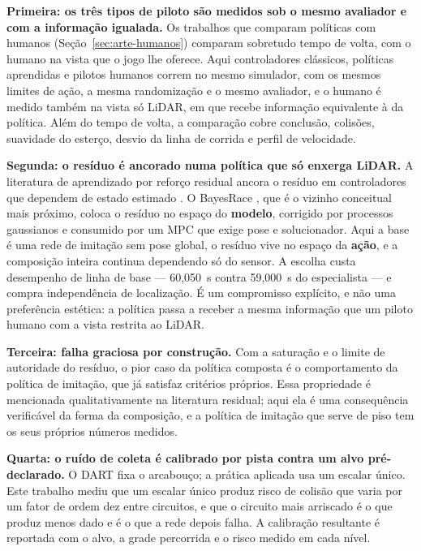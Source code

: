 \textbf{Primeira: os três tipos de piloto são medidos sob o mesmo avaliador e com
a informação igualada.} Os trabalhos que comparam políticas com humanos
(Seção~\ref{sec:arte-humanos}) comparam sobretudo tempo de volta, com o humano na
vista que o jogo lhe oferece. Aqui controladores clássicos, políticas aprendidas
e pilotos humanos correm no mesmo simulador, com os mesmos limites de ação, a
mesma randomização e o mesmo avaliador, e o humano é medido também na vista só
LiDAR, em que recebe informação equivalente à da política. Além do tempo de volta,
a comparação cobre conclusão, colisões, suavidade do esterço, desvio da linha de
corrida e perfil de velocidade.

\textbf{Segunda: o resíduo é ancorado numa política que só enxerga LiDAR.} A
literatura de aprendizado por reforço residual ancora o resíduo em controladores
que dependem de estado estimado \cite{Silver2018ResidualPolicy,
Johannink2019Residual}. O BayesRace \cite{Jain2020Bayesrace}, que é o vizinho
conceitual mais próximo, coloca o resíduo no espaço do \textbf{modelo}, corrigido
por processos gaussianos e consumido por um MPC que exige pose e solucionador.
Aqui a base é uma rede de imitação sem pose global, o resíduo vive no espaço da
\textbf{ação}, e a composição inteira continua dependendo só do sensor. A escolha custa
desempenho de linha de base --- 60,050~s contra 59,000~s do especialista --- e
compra independência de localização. É um compromisso explícito, e não uma
preferência estética: a política passa a receber a mesma informação que um
piloto humano com a vista restrita ao LiDAR.

\textbf{Terceira: falha graciosa por construção.} Com a saturação e o limite de
autoridade do resíduo, o pior caso da política composta é o comportamento da
política de imitação, que já satisfaz critérios próprios. Essa propriedade é
mencionada qualitativamente na literatura residual; aqui ela é uma consequência
verificável da forma da composição, e a política de imitação que serve de piso
tem os seus próprios números medidos.

\textbf{Quarta: o ruído de coleta é calibrado por pista contra um alvo
pré-declarado.} O DART \cite{Laskey2017DART} fixa o arcabouço; a prática aplicada
usa um escalar único. Este trabalho mediu que um escalar único produz risco de
colisão que varia por um fator de ordem dez entre circuitos, e que o circuito mais
arriscado é o que produz menos dado e é o que a rede depois falha. A calibração
resultante é reportada com o alvo, a grade percorrida e o risco medido em cada
nível.

